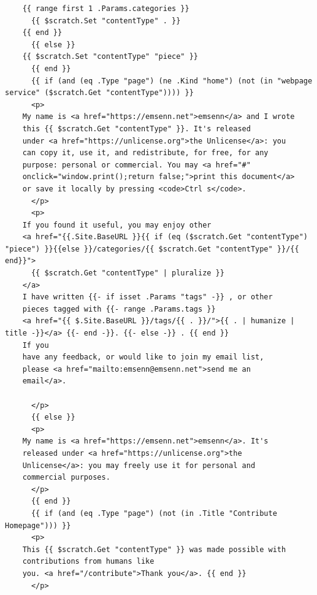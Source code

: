 \documentclass[11pt]{article}
\begin{document}
\begin{enumerate}
\begin{verbatim}
	{{ range first 1 .Params.categories }}
	  {{ $scratch.Set "contentType" . }}
	{{ end }}
      {{ else }}
	{{ $scratch.Set "contentType" "piece" }}
      {{ end }}
      {{ if (and (eq .Type "page") (ne .Kind "home") (not (in "webpage service" ($scratch.Get "contentType")))) }}
      <p>
	My name is <a href="https://emsenn.net">emsenn</a> and I wrote
	this {{ $scratch.Get "contentType" }}. It's released
	under <a href="https://unlicense.org">the Unlicense</a>: you
	can copy it, use it, and redistribute, for free, for any
	purpose: personal or commercial. You may <a href="#"
	onclick="window.print();return false;">print this document</a>
	or save it locally by pressing <code>Ctrl s</code>.
      </p>
      <p>
	If you found it useful, you may enjoy other
	<a href="{{.Site.BaseURL }}{{ if (eq ($scratch.Get "contentType") "piece") }}{{else }}/categories/{{ $scratch.Get "contentType" }}/{{ end}}">
	  {{ $scratch.Get "contentType" | pluralize }}
	</a>
	I have written {{- if isset .Params "tags" -}} , or other
	pieces tagged with {{- range .Params.tags }}
	<a href="{{ $.Site.BaseURL }}/tags/{{ . }}/">{{ . | humanize | title -}}</a> {{- end -}}. {{- else -}} . {{ end }}
	If you
	have any feedback, or would like to join my email list,
	please <a href="mailto:emsenn@emsenn.net">send me an
	email</a>.

      </p>
      {{ else }}
      <p>
	My name is <a href="https://emsenn.net">emsenn</a>. It's
	released under <a href="https://unlicense.org">the
	Unlicense</a>: you may freely use it for personal and
	commercial purposes.
      </p>
      {{ end }}
      {{ if (and (eq .Type "page") (not (in .Title "Contribute Homepage"))) }}
      <p>
	This {{ $scratch.Get "contentType" }} was made possible with
	contributions from humans like
	you. <a href="/contribute">Thank you</a>. {{ end }}
      </p>


\end{verbatim}
\end{enumerate}
\end{document}
